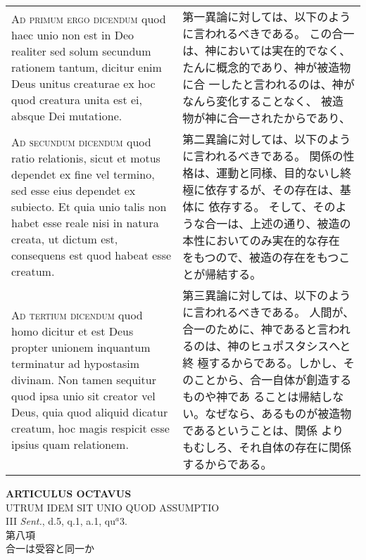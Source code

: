 \documentclass[10pt]{jsarticle} %
\begin{document}
\begin{longtable}{p{21em}p{21em}}
{\scshape Ad primum ergo dicendum} quod haec unio non est in Deo realiter sed solum
secundum rationem tantum, dicitur enim Deus unitus creaturae ex hoc quod
creatura unita est ei, absque Dei mutatione.


&


第一異論に対しては、以下のように言われるべきである。
この合一は、神においては実在的でなく、たんに概念的であり、神が被造物に合
 一したと言われるのは、神がなんら変化することなく、
被造物が神に合一されたからであり、

\\



{\scshape Ad secundum dicendum} quod ratio relationis, sicut et motus dependet ex
fine vel termino, sed esse eius dependet ex subiecto. Et quia unio talis
non habet esse reale nisi in natura creata, ut dictum est, consequens
est quod habeat esse creatum.


&

第二異論に対しては、以下のように言われるべきである。
関係の性格は、運動と同様、目的ないし終極に依存するが、その存在は、基体に
 依存する。
そして、そのような合一は、上述の通り、被造の本性においてのみ実在的な存在
 をもつので、被造の存在をもつことが帰結する。

\\



{\scshape Ad tertium dicendum} quod homo dicitur et est Deus propter unionem
inquantum terminatur ad hypostasim divinam. Non tamen sequitur quod ipsa
unio sit creator vel Deus, quia quod aliquid dicatur creatum, hoc magis
respicit esse ipsius quam relationem.


&

第三異論に対しては、以下のように言われるべきである。
人間が、合一のために、神であると言われるのは、神のヒュポスタシスへと終
 極するからである。しかし、そのことから、合一自体が創造するものや神であ
 ることは帰結しない。なぜなら、あるものが被造物であるということは、関係
 よりもむしろ、それ自体の存在に関係するからである。

\\




\end{longtable}
\newpage






\begin{center}
 {\Large {\bf ARTICULUS OCTAVUS}}\\
 {\large UTRUM IDEM SIT UNIO QUOD ASSUMPTIO}\\
 {\footnotesize III {\itshape Sent.}, d.5, q.1, a.1, qu$^a$3.}\\
 {\Large 第八項\\合一は受容と同一か}
\end{center}
\end{document}
